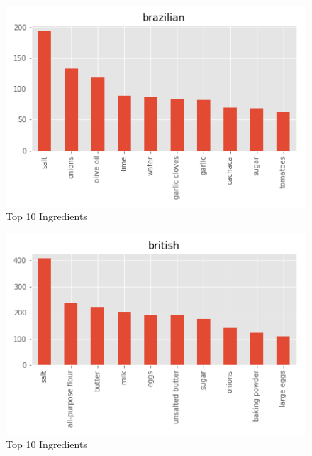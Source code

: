 \documentclass[sigconf]{acmart}
\begin{document}
\begin{figure}[!ht]
  \centering\includegraphics[width=\columnwidth]{images/brazilian_10_most_used_ingredients.png}
  \caption{Top 10 Ingredients }\label{f:brazilian_10_most_used_ingredients}
\end{figure}

\begin{figure}[!ht]
  \centering\includegraphics[width=\columnwidth]{images/british_10_most_used_ingredients.png}
  \caption{Top 10 Ingredients }\label{f:british_10_most_used_ingredients}
\end{figure}
\end{document}
